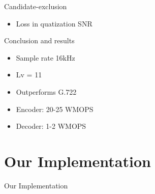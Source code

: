 \documentclass[10pt]{beamer}
\begin{document}
  \begin{frame}{Candidate-exclusion}
    \begin{itemize}
      \item Loss in quatization SNR
    \end{itemize}
  \end{frame}

  \begin{frame}{Conclusion and results}
    \begin{itemize}
      \item Sample rate 16kHz
      \item Lv = 11
      \item Outperforms G.722
      \item Encoder: 20-25 WMOPS
      \item Decoder: 1-2 WMOPS
    \end{itemize}
  \end{frame}



  \begingroup
  \section{Our Implementation}
  \endgroup

  \begin{frame}{Our Implementation}

  \end{frame}



\maketitle
\end{document}
